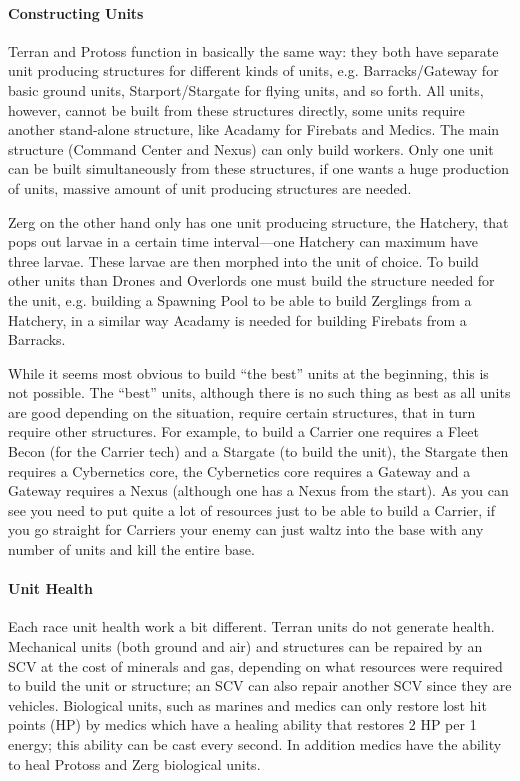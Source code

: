 \paragraph{Constructing Units}
Terran and Protoss function in basically the same way: they both have separate unit producing structures for different kinds of units, e.g. Barracks/Gateway for basic ground units, Starport/Stargate for flying units, and so forth. All units, however, cannot be built from these structures directly, some units require another stand-alone structure, like Acadamy for Firebats and Medics. The main structure (Command Center and Nexus) can only build workers. Only one unit can be built simultaneously from these structures, if one wants a huge production of units, massive amount of unit producing structures are needed.

Zerg on the other hand only has one unit producing structure, the Hatchery, that pops out larvae in a certain time interval—one Hatchery can maximum have three larvae. These larvae are then morphed into the unit of choice. To build other units than Drones and Overlords one must build the structure needed for the unit, e.g. building a Spawning Pool to be able to build Zerglings from a Hatchery, in a similar way Acadamy is needed for building Firebats from a Barracks.

While it seems most obvious to build “the best” units at the beginning, this is not possible. The “best” units, although there is no such thing as best as all units are good depending on the situation, require certain structures, that in turn require other structures. For example, to build a Carrier one requires a Fleet Becon (for the Carrier tech) and a Stargate (to build the unit), the Stargate then requires a Cybernetics core, the Cybernetics core requires a Gateway and a Gateway requires a Nexus (although one has a Nexus from the start). As you can see you need to put quite a lot of resources just to be able to build a Carrier, if you go straight for Carriers your enemy can just waltz into the base with any number of units and kill the entire base.

\paragraph{Unit Health}
Each race unit health work a bit different. Terran units do not generate health. Mechanical units (both ground and air) and structures can be repaired by an SCV at the cost of minerals and gas, depending on what resources were required to build the unit or structure; an SCV can also repair another SCV since they are vehicles. Biological units, such as marines and medics can only restore lost hit points (HP) by medics which have a healing ability that restores 2 HP per 1 energy; this ability can be cast every second. In addition medics have the ability to heal Protoss and Zerg biological units.

